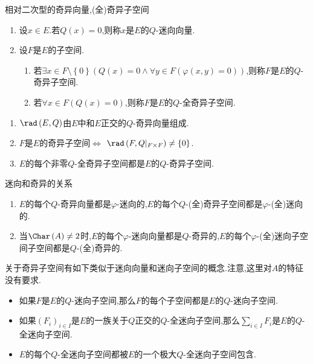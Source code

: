 \begin{definition}{相对二次型的奇异向量,(全)奇异子空间}{}
	\begin{enumerate}
		\item 设$x\in E$.若$Q\left(x\right)=0$,则称$x$是$E$的$Q$-迷向向量.
		\item 设$F$是$E$的子空间.
		\begin{enumerate}
			\item 若$\exists x\in F\setminus\left\{0\right\}\left(Q\left(x\right)=0\wedge\forall y\in F\left(\varphi\left(x,y\right)=0\right)\right)$,则称$F$是$E$的$Q$-奇异子空间.
			\item 若$\forall x\in F\left(Q\left(x\right)=0\right)$,则称$F$是$E$的$Q$-全奇异子空间.
		\end{enumerate}
	\end{enumerate}
\end{definition}

\begin{remark}{}{}
	\begin{enumerate}
		\item $\rad\left(E,Q\right)$由$E$中和$E$正交的$Q$-奇异向量组成.
		\item $F$是$E$的奇异子空间$\iff$ $\rad\left(F,Q|_{F\times F}\right)\neq\left\{0\right\}$.
		\item $E$的每个非零$Q$-全奇异子空间都是$E$的$Q$-奇异子空间.
	\end{enumerate}
\end{remark}

\begin{proposition}{迷向和奇异的关系}{}
	\begin{enumerate}
		\item $E$的每个$Q$-奇异向量都是$\varphi$-迷向的,$E$的每个$Q$-(全)奇异子空间都是$\varphi$-(全)迷向的.
		\item 当$\Char\left(A\right)\neq 2$时,$E$的每个$\varphi$-迷向向量都是$Q$-奇异的,$E$的每个$\varphi$-(全)迷向子空间子空间都是$Q$-(全)奇异的.
	\end{enumerate}
\end{proposition}

\begin{remark}{}{}
	关于奇异子空间有如下类似于迷向向量和迷向子空间的概念.注意,这里对$A$的特征没有要求.
	\begin{itemize}
		\item 如果$F$是$E$的$Q$-迷向子空间,那么$F$的每个子空间都是$E$的$Q$-迷向子空间.
		\item 如果$\left(F_{i}\right)_{i\in I}$是$E$的一族关于$Q$正交的$Q$-全迷向子空间,那么$\sum\limits_{i\in I}F_{i}$是$E$的$Q$-全迷向子空间.
		\item $E$的每个$Q$-全迷向子空间都被$E$的一个极大$Q$-全迷向子空间包含.
	\end{itemize}
\end{remark}